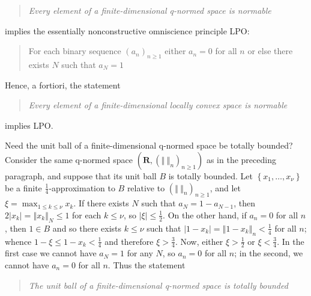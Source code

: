 \documentclass[11pt]{article}%
\begin{document}
\begin{quote}
\emph{Every element of a finite-dimensional q-normed space is normable}
\end{quote}

%

\noindent
implies the essentially nonconstructive omniscience principle \textsf{LPO}:

\begin{quote}
For each binary sequence $\left(  a_{n}\right)  _{n\geq1}$ either $a_{n}=0$
for all $n$ or else there exists $N$ such that $a_{N}=1$
\end{quote}

%

\noindent
\textsf{Hence, a fortiori, the statement}

\begin{quote}
\emph{Every element of a finite-dimensional locally convex space is normable}
\end{quote}

%

\noindent
implies \textsf{LPO}.

Need the unit ball of a finite-dimensional q-normed space be totally bounded?
Consider the same q-normed space $\left(  \mathbf{R},\left(  \left\Vert
\ \right\Vert _{n}\right)  _{n\geq1}\right)  $ as in the preceding paragraph,
and suppose that its unit ball $B$ is totally bounded. Let $\left\{
x_{1},\ldots,x_{\nu}\right\}  $ be a finite $\frac{1}{4}$-approximation to $B$
relative to $\left(  \left\Vert \ \right\Vert _{n}\right)  _{n\geq1}$, and let
$\xi=\max_{1\leq k\leq\nu}x_{k}$. If there exists $N$ such that $a_{N}%
=1-a_{N-1}$, then $2\left\vert x_{k}\right\vert =\left\Vert x_{k}\right\Vert
_{N}\leq1$ for each $k\leq\nu$, so $\left\vert \xi\right\vert \leq\frac{1}{2}%
$. On the other hand, if $a_{n}=0$ for all $n$, then $1\in B$ and so there
exists $k\leq\nu$ such that $\left\vert 1-x_{k}\right\vert =\left\Vert
1-x_{k}\right\Vert _{n}<\frac{1}{4}$ for all $n$; whence $1-\xi\leq
1-x_{k}<\frac{1}{4}$ and therefore $\xi>\frac{3}{4}$. Now, either $\xi
>\frac{1}{2}$ or $\xi<\frac{3}{4}$. In the first case we cannot have $a_{N}=1$
for any $N$, so $a_{n}=0$ for all $n$; in the second, we cannot have $a_{n}=0$
for all $n$. Thus the statement\label{ere2}

\begin{quote}
\emph{The unit ball of a finite-dimensional q-normed space is totally bounded}
\end{quote}
\end{document}
